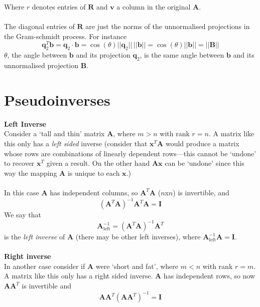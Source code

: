 \documentclass{report}
\begin{document}
Where $r$ denotes entries of $\bm R$ and $\bm v$ a column in the original $\bm A$.\\
\vspace{1mm}\\
The diagonal entries of $\bm R$ are just the norms of the unnormalised projections in the Gram-schmidt process. For instance 
\begin{equation*}
\bm q_2^T\bm b=\bm q_2\cdot\bm b=\cos(\theta)||\bm q_2||\,||\bm b||=\cos(\theta)||\bm b||=||\bm B||
\end{equation*}
$\theta$, the angle between $\bm b$ and its projection $\bm q_2$, is the same angle between $\bm b$ and its unnormalised projection $\bm B$.
\newpage

\section{Pseudoinverses}
\textbf{Left Inverse}\\
Consider a `tall and thin' matrix $\bm A$, where $m>n$ with rank $r=n$. A matrix like this only has a \textit{left sided} inverse (consider that $\bm{x}^T\bm{A}$ would 
produce a matrix whose rows are combinations of linearly dependent rows---this cannot be `undone' to recover $\bm x^T$ given a result. On the other hand $\bm{Ax}$ can be
`undone' since this way the mapping $\bm A$ is unique to each $\bm x$.) \\
\vspace{1mm}\\
In this case $\bm A$ has independent columns, so $\bm A^T\bm A$ ($n$x$n$) is invertible, and 
\begin{equation*}
(\bm A^T\bm A)^{-1}\bm A^T\bm A=\bm I
\end{equation*}
We say that 
\begin{equation*}
\bm{A}^{-1}_{\text{left}}=(\bm A^T\bm A)^{-1}\bm A^T
\end{equation*}
is the \textit{left inverse} of $\bm A$ (there may be other left inverses), where 
$\bm{A}^{-1}_{\text{left}}\bm A=\bm I$.\\
\vspace{1mm}\\
\textbf{Right inverse}\\
In another case consider if $\bm A$ were `short and fat', where $m<n$ with rank $r=m$. A matrix like this only has a right sided inverse. $\bm A$ has independent rows, so
now $\bm A\bm A^T$ is invertible and 
\begin{equation*}
\bm A\bm A^T(\bm A\bm A^T)^{-1}=\bm I
\end{equation*}
\end{document}
